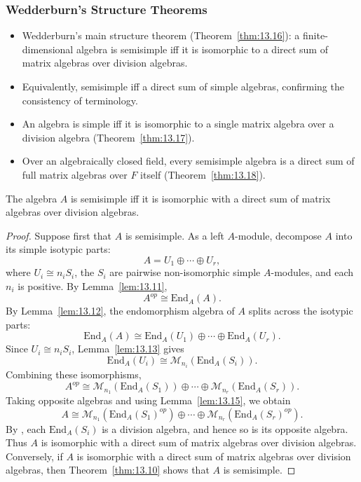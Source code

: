\documentclass[../Odyssey_Project.tex]{subfiles}
\begin{document}
\subsubsection*{Wedderburn's Structure Theorems}
\begin{itemize}
    \item Wedderburn's main structure theorem (Theorem~\ref{thm:13.16}): a finite-dimensional algebra is semisimple iff it is isomorphic to a direct sum of matrix algebras over division algebras.
    \item Equivalently, semisimple iff a direct sum of simple algebras, confirming the consistency of terminology.
    \item An algebra is simple iff it is isomorphic to a single matrix algebra over a division algebra (Theorem~\ref{thm:13.17}).
    \item Over an algebraically closed field, every semisimple algebra is a direct sum of full matrix algebras over $F$ itself (Theorem~\ref{thm:13.18}).
\end{itemize}

\begin{theorem}
\label{thm:13.16}
The algebra $A$ is semisimple iff it is isomorphic with a direct sum of matrix algebras over division algebras.
\end{theorem}
\begin{proof}
    Suppose first that $A$ is semisimple. As a left $A$-module, decompose $A$ into its simple isotypic parts:
    \[
        A = U_1 \oplus \cdots \oplus U_r,
    \]
    where $U_i \cong n_iS_i$, the $S_i$ are pairwise non-isomorphic simple $A$-modules, and each $n_i$ is positive. By Lemma~\ref{lem:13.11},
    \[
        A^{op} \cong \mathrm{End}_A(A).
    \]
    By Lemma~\ref{lem:13.12}, the endomorphism algebra of $A$ splits across the isotypic parts:
    \[
        \mathrm{End}_A(A)
        \cong \mathrm{End}_A(U_1) \oplus \cdots \oplus \mathrm{End}_A(U_r).
    \]
    Since $U_i \cong n_iS_i$, Lemma~\ref{lem:13.13} gives
    \[
        \mathrm{End}_A(U_i) \cong \mathcal{M}_{n_i}(\mathrm{End}_A(S_i)).
    \]
    Combining these isomorphisms,
    \[
        A^{op}
        \cong
        \mathcal{M}_{n_1}(\mathrm{End}_A(S_1))
        \oplus \cdots \oplus
        \mathcal{M}_{n_r}(\mathrm{End}_A(S_r)).
    \]
    Taking opposite algebras and using Lemma~\ref{lem:13.15}, we obtain
    \[
        A
        \cong
        \mathcal{M}_{n_1}(\mathrm{End}_A(S_1)^{op})
        \oplus \cdots \oplus
        \mathcal{M}_{n_r}(\mathrm{End}_A(S_r)^{op}).
    \]
    By , each $\mathrm{End}_A(S_i)$ is a division algebra, and hence so is its opposite algebra. Thus $A$ is isomorphic with a direct sum of matrix algebras over division algebras.\\
    Conversely, if $A$ is isomorphic with a direct sum of matrix algebras over division algebras, then Theorem~\ref{thm:13.10} shows that $A$ is semisimple.
\end{proof}
\end{document}
